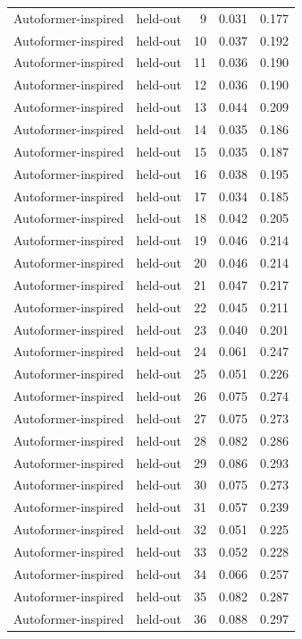 \begin{tabular}{llrrr}
Autoformer-inspired & held-out & 9 & 0.031 & 0.177 \\
Autoformer-inspired & held-out & 10 & 0.037 & 0.192 \\
Autoformer-inspired & held-out & 11 & 0.036 & 0.190 \\
Autoformer-inspired & held-out & 12 & 0.036 & 0.190 \\
Autoformer-inspired & held-out & 13 & 0.044 & 0.209 \\
Autoformer-inspired & held-out & 14 & 0.035 & 0.186 \\
Autoformer-inspired & held-out & 15 & 0.035 & 0.187 \\
Autoformer-inspired & held-out & 16 & 0.038 & 0.195 \\
Autoformer-inspired & held-out & 17 & 0.034 & 0.185 \\
Autoformer-inspired & held-out & 18 & 0.042 & 0.205 \\
Autoformer-inspired & held-out & 19 & 0.046 & 0.214 \\
Autoformer-inspired & held-out & 20 & 0.046 & 0.214 \\
Autoformer-inspired & held-out & 21 & 0.047 & 0.217 \\
Autoformer-inspired & held-out & 22 & 0.045 & 0.211 \\
Autoformer-inspired & held-out & 23 & 0.040 & 0.201 \\
Autoformer-inspired & held-out & 24 & 0.061 & 0.247 \\
Autoformer-inspired & held-out & 25 & 0.051 & 0.226 \\
Autoformer-inspired & held-out & 26 & 0.075 & 0.274 \\
Autoformer-inspired & held-out & 27 & 0.075 & 0.273 \\
Autoformer-inspired & held-out & 28 & 0.082 & 0.286 \\
Autoformer-inspired & held-out & 29 & 0.086 & 0.293 \\
Autoformer-inspired & held-out & 30 & 0.075 & 0.273 \\
Autoformer-inspired & held-out & 31 & 0.057 & 0.239 \\
Autoformer-inspired & held-out & 32 & 0.051 & 0.225 \\
Autoformer-inspired & held-out & 33 & 0.052 & 0.228 \\
Autoformer-inspired & held-out & 34 & 0.066 & 0.257 \\
Autoformer-inspired & held-out & 35 & 0.082 & 0.287 \\
Autoformer-inspired & held-out & 36 & 0.088 & 0.297 \\

\end{tabular}
